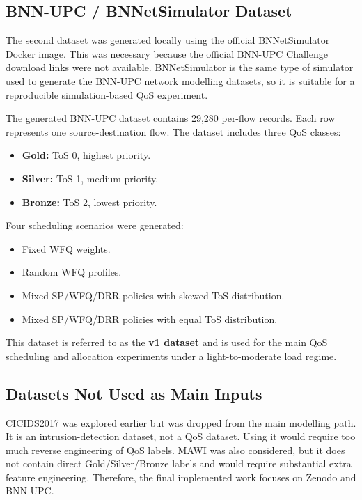 \documentclass[a4paper,12pt]{Classes/RoboticsLaTeX}
\begin{document}
\subsection{BNN-UPC / BNNetSimulator Dataset}

The second dataset was generated locally using the official BNNetSimulator Docker image. This was necessary because the official BNN-UPC Challenge download links were not available. BNNetSimulator is the same type of simulator used to generate the BNN-UPC network modelling datasets, so it is suitable for a reproducible simulation-based QoS experiment.

The generated BNN-UPC dataset contains 29,280 per-flow records. Each row represents one source-destination flow. The dataset includes three QoS classes:

\begin{itemize}
    \item \textbf{Gold:} ToS 0, highest priority.
    \item \textbf{Silver:} ToS 1, medium priority.
    \item \textbf{Bronze:} ToS 2, lowest priority.
\end{itemize}

Four scheduling scenarios were generated:

\begin{itemize}
    \item Fixed WFQ weights.
    \item Random WFQ profiles.
    \item Mixed SP/WFQ/DRR policies with skewed ToS distribution.
    \item Mixed SP/WFQ/DRR policies with equal ToS distribution.
\end{itemize}

This dataset is referred to as the \textbf{v1 dataset} and is used for the main QoS scheduling and allocation experiments under a light-to-moderate load regime.

\subsection{Datasets Not Used as Main Inputs}

CICIDS2017 was explored earlier but was dropped from the main modelling path. It is an intrusion-detection dataset, not a QoS dataset. Using it would require too much reverse engineering of QoS labels. MAWI was also considered, but it does not contain direct Gold/Silver/Bronze labels and would require substantial extra feature engineering. Therefore, the final implemented work focuses on Zenodo and BNN-UPC.
\end{document}
